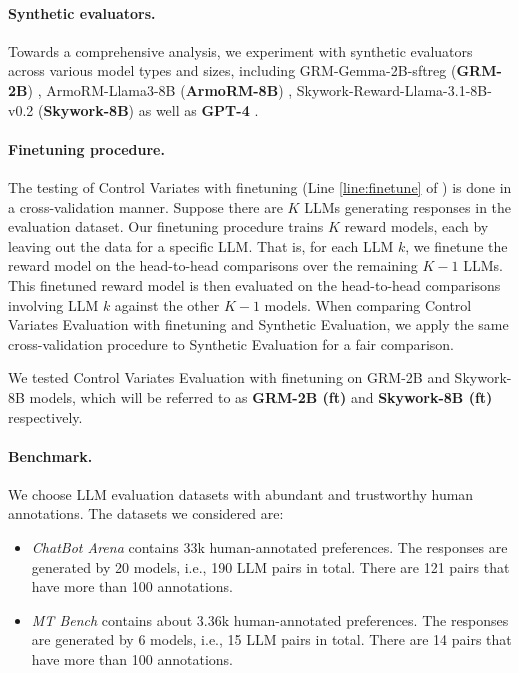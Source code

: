 \paragraph{Synthetic evaluators.} Towards a comprehensive analysis, we experiment with synthetic evaluators across various model types and sizes, including GRM-Gemma-2B-sftreg (\textbf{GRM-2B}) \citep{yang2024regularizing}, ArmoRM-Llama3-8B (\textbf{ArmoRM-8B}) \citep{ArmoRM}, 
Skywork-Reward-Llama-3.1-8B-v0.2  (\textbf{Skywork-8B}) \citep{liu2024skywork} as well as \textbf{GPT-4} \citep{achiam2023gpt}.

\paragraph{Finetuning procedure.}
The testing of Control Variates with finetuning (Line \ref{line:finetune} of ) is done in a cross-validation manner.
Suppose there are $K$ LLMs generating responses in the evaluation dataset. Our finetuning procedure trains $K$ reward models, each by leaving out the data for a specific LLM. That is, for each LLM $k$, we finetune the reward model on the head-to-head comparisons over the remaining $K-1$ LLMs. 
This finetuned reward model is then evaluated on the head-to-head comparisons involving LLM $k$ against the other $K-1$ models.
When comparing Control Variates Evaluation with finetuning and Synthetic Evaluation, we apply the same cross-validation procedure to Synthetic Evaluation for a fair comparison.

We tested Control Variates Evaluation with finetuning on GRM-2B and Skywork-8B models, which will be referred to as \textbf{GRM-2B (ft)} and \textbf{Skywork-8B (ft)} respectively.

\paragraph{Benchmark.} We choose LLM evaluation datasets with abundant and trustworthy human annotations. The datasets we considered are:
\begin{itemize}
    \item \emph{ChatBot Arena} \citep{zheng2023judging} contains 33k human-annotated preferences. The responses are generated by 20 models, i.e.,  190 LLM pairs in total. There are 121 pairs that have more than 100 annotations.
    \item \emph{MT Bench} \citep{zheng2023judging} contains about 3.36k human-annotated preferences. The responses are generated by 6 models, i.e., 15 LLM pairs in total. There are 14 pairs that have more than 100 annotations.
\end{itemize}

